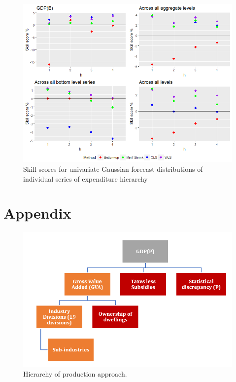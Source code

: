 \documentclass[graybox]{svmult}
\begin{document}
\begin{figure}[H]
	\centering
	\small
	\includegraphics[scale=0.50]{Figs/Results/EXP-ProbNonParaF-UnivS_CRPS.PNG}
	\caption{Skill scores for univariate Gaussian forecast distributions of individual series of expenditure hierarchy}\label{Exp_ProbNonParF_UnivS}
\end{figure}




\pagebreak



\section*{Appendix}

\begin{figure}[H]
	\centering
	\small
	\includegraphics[scale=0.65]{Figs/GDP_P_fig1.PNG}
	\caption{Hierarchy of production approach.}\label{GDP_P_fig1}
\end{figure}
\end{document}
